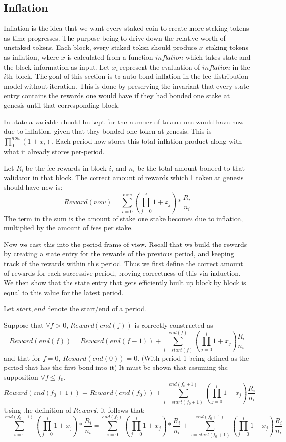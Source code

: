 \documentclass[]{article}
\begin{document}
\subsection{Inflation}
Inflation is the idea that we want every staked coin to create more staking tokens as time progresses.
The purpose being to drive down the relative worth of unstaked tokens.
Each block, every staked token should produce $x$ staking tokens as inflation, where $x$ is calculated from a function $inflation$ which takes state and the block information as input.
Let $x_i$ represent the evaluation of $inflation$ in the $i$th block.
The goal of this section is to auto-bond inflation in the fee distribution model without iteration.
This is done by preserving the invariant that every state entry contains the rewards one would have if they had bonded one stake at genesis until that corresponding block.

In state a variable should be kept for the number of tokens one would have now due to inflation,
given that they bonded one token at genesis.
This is $\prod_{0}^{now} (1 + x_i)$.
Each period now stores this total inflation product along with what it already stores per-period.

Let $R_i$ be the fee rewards in block $i$, and $n_i$ be the total amount bonded to that validator in that block.
The correct amount of rewards which 1 token at genesis should have now is:
$$Reward(now) = \sum_{i = 0}^{now}\left(\prod_{j = 0}^{i} 1 + x_j \right) * \frac{R_i}{n_i}$$
The term in the sum is the amount of stake one stake becomes due to inflation, multiplied by the amount of fees per stake.

Now we cast this into the period frame of view.
Recall that we build the rewards by creating a state entry for the rewards of the previous period, and keeping track of the rewards within this period.
Thus we first define the correct amount of rewards for each successive period, proving correctness of this via induction.
We then show that the state entry that gets efficiently built up block by block is equal to this value for the latest period.

Let $start, end$ denote the start/end of a period.

Suppose that $\forall f > 0$, $Reward(end(f))$ is correctly constructed as
$$Reward(end(f)) = Reward(end(f-1)) + \sum_{i = start(f)}^{end(f)}\left(\prod_{j = 0}^{i} 1 + x_j \right) \frac{R_i}{n_i}$$
and that for $f = 0$, $Reward(end(0)) = 0$.
(With period 1 being defined as the period that has the first bond into it)
It must be shown that assuming the supposition $\forall f \leq f_0$, $$Reward(end(f_0 + 1)) = Reward(end(f_0)) + \sum_{i = start(f_0 + 1)}^{end(f_0 + 1)}\left(\prod_{j = 0}^{i} 1 + x_j \right) \frac{R_i}{n_i}$$
Using the definition of $Reward$, it follows that:
$$\sum_{i = 0}^{end(f_0 + 1)}\left(\prod_{j = 0}^{i} 1 + x_j \right) * \frac{R_i}{n_i} = \sum_{i = 0}^{end(f_0)}\left(\prod_{j = 0}^{i} 1 + x_j \right) * \frac{R_i}{n_i} + \sum_{i = start(f_0 + 1)}^{end(f_0 + 1)}\left(\prod_{j = 0}^{i} 1 + x_j \right) \frac{R_i}{n_i}$$
\end{document}
